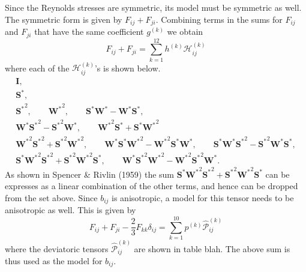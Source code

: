 \documentclass[oneside,a4paper,11pt]{report}
\newcommand{\nars}{b}           %
\newcommand{\Stau}{S^*}
\newcommand{\Wtau}{W^*}
\begin{document}
Since the Reynolds stresses are symmetric, its model must be symmetric as well. The symmetric form is given by $F_{ij} + F_{ji}$. Combining terms in the sums for $F_{ij}$ and $F_{ji}$ that have the same coefficient $g^{(k)}$ we obtain
\begin{equation}
F_{ij} + F_{ji} = \sum_{k=1}^{12} h^{(k)} \mathcal{H}_{ij}^{(k)}
\end{equation}
where each of the $\mathcal{H}_{ij}^{(k)}$'s is shown below.
\begin{gather}
\mathbf{I}, \nonumber \\
\mathbf{\Stau}, \nonumber \\
\mathbf{\Stau}^2, \qquad \mathbf{\Wtau}^2, \qquad \mathbf{\Stau} \mathbf{\Wtau} - \mathbf{\Wtau} \mathbf{\Stau}, \nonumber \\
\mathbf{\Wtau} \mathbf{\Stau}^2 - \mathbf{\Stau}^2 \mathbf{\Wtau}, \qquad \mathbf{\Wtau}^2 \mathbf{\Stau} + \mathbf{\Stau} \mathbf{\Wtau}^2 \nonumber \\
\mathbf{\Wtau}^2 \mathbf{\Stau}^2 + \mathbf{\Stau}^2 \mathbf{\Wtau}^2, \qquad \mathbf{\Wtau} \mathbf{\Stau} \mathbf{\Wtau}^2 - \mathbf{\Wtau}^2 \mathbf{\Stau} \mathbf{\Wtau}, \qquad \mathbf{\Stau} \mathbf{\Wtau} \mathbf{\Stau}^2 - \mathbf{\Stau}^2 \mathbf{\Wtau} \mathbf{\Stau} ,\nonumber \\
\mathbf{\Stau} \mathbf{\Wtau}^2 \mathbf{\Stau}^2 + \mathbf{\Stau}^2 \mathbf{\Wtau}^2 \mathbf{\Stau}, \qquad \mathbf{\Wtau} \mathbf{\Stau}^2 \mathbf{\Wtau}^2 - \mathbf{\Wtau}^2 \mathbf{\Stau}^2 \mathbf{\Wtau}.
\end{gather}
As shown in Spencer \& Rivlin (1959) the sum $\mathbf{\Stau} \mathbf{\Wtau}^2 \mathbf{\Stau}^2 + \mathbf{\Stau}^2 \mathbf{\Wtau}^2 \mathbf{\Stau}$ can be expresses as a linear combination of the other terms, and hence can be dropped from the set above. Since $\nars_{ij}$ is anisotropic, a model for this tensor needs to be anisotropic as well. This is given by 
\begin{equation}
F_{ij} + F_{ji} - \frac{2}{3} F_{kk} \delta_{ij} = \sum_{k=1}^{10} p^{(k)} \hat{\mathcal{P}}_{ij}^{(k)}
\end{equation}
where the deviatoric tensors $\hat{\mathcal{P}}_{ij}^{(k)}$ are shown in table blah. The above sum is thus used as the model for $\nars_{ij}$.
\end{document}
